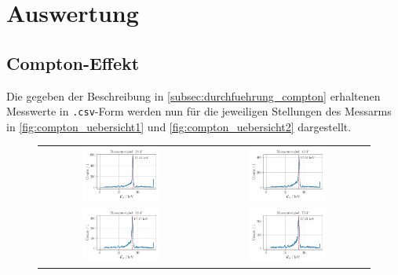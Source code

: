 \documentclass[ngerman]{scrartcl}
\begin{document}
\section{Auswertung}
\label{sec:auswertung}

\subsection{Compton-Effekt}
\label{subsec:auswertung_compton}

Die gegeben der Beschreibung in \ref{subsec:durchfuehrung_compton} erhaltenen Messwerte in \texttt{.csv}-Form werden nun für die jeweiligen Stellungen des Messarms in \autoref{fig:compton_uebersicht1} und \autoref{fig:compton_uebersicht2} dargestellt.
%
\begin{figure}[H]
    \centering
    \begin{tabular}{cc}
        \includegraphics[width=0.48\textwidth]{../plots/energie_spektren_1.pdf} &
        \includegraphics[width=0.48\textwidth]{../plots/energie_spektren_2.pdf}   \\
        \includegraphics[width=0.48\textwidth]{../plots/energie_spektren_3.pdf} &
        \includegraphics[width=0.48\textwidth]{../plots/energie_spektren_4.pdf}   \\

\end{tabular}
\end{figure}
\end{document}
